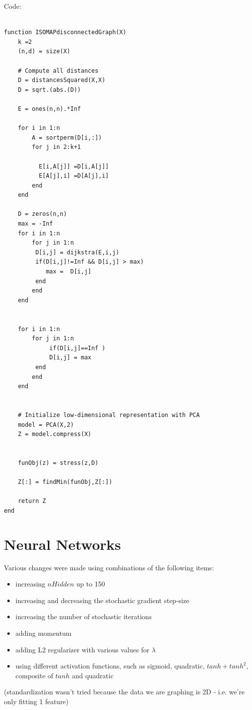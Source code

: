 \documentclass{article}
\def\items#1{\begin{itemize}#1\end{itemize}}
\begin{document}
Code:
\begin{verbatim}

function ISOMAPdisconnectedGraph(X)
    k =2
    (n,d) = size(X)

    # Compute all distances
    D = distancesSquared(X,X)
    D = sqrt.(abs.(D))

    E = ones(n,n).*Inf

    for i in 1:n
        A = sortperm(D[i,:])
        for j in 2:k+1
          
          E[i,A[j]] =D[i,A[j]]
          E[A[j],i] =D[A[j],i]     
        end 
    end

    D = zeros(n,n)
    max = -Inf
    for i in 1:n
        for j in 1:n
         D[i,j] = dijkstra(E,i,j)
         if(D[i,j]!=Inf && D[i,j] > max)
            max =  D[i,j]
         end
        end
    end


    for i in 1:n
        for j in 1:n
             if(D[i,j]==Inf )
             D[i,j] = max
         end
        end
    end


    # Initialize low-dimensional representation with PCA
    model = PCA(X,2)
    Z = model.compress(X)
    

    funObj(z) = stress(z,D)

    Z[:] = findMin(funObj,Z[:])

    return Z
end

\end{verbatim}

\section{Neural Networks}

Various changes were made using combinations of the following items:
\items{
\item increasing $nHidden$ up to 150
\item increasing and decreasing the stochastic gradient step-size
\item increasing the number of stochastic iterations
\item adding momentum
\item adding L2 regularizer with various values for $\lambda$
\item using different activation functions, such as sigmoid, quadratic, $tanh + tanh^2$, composite of $tanh$ and quadratic
}

(standardization wasn't tried because the data we are graphing is 2D - i.e. we're only fitting 1 feature)
\end{document}
